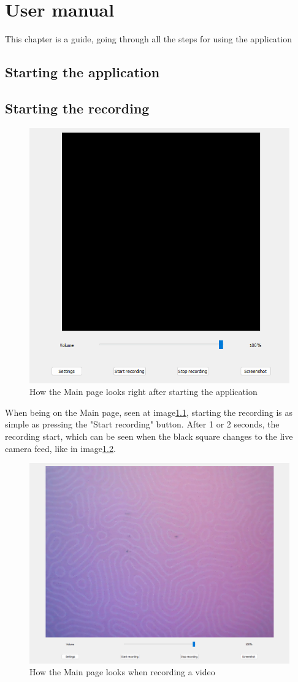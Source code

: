 \chapter{User manual}
\label{chap:manual}

\par This chapter is a guide, going through all the steps for using the application

\section{Starting the application}
\label{sec:manualsec1}

\section{Starting the recording}
\label{sec:manualsec2}

\begin{figure}
    \centering
    \includegraphics[width=0.5\linewidth]{figures/MainPage.png}
    \caption{How the Main page looks right after starting the application}
    \label{fig:MainPageLooks}
\end{figure}

\par When being on the Main page, seen at image\ref{fig:MainPageLooks}, starting the recording is as simple as pressing the "Start recording" button. After 1 or 2 seconds, the recording start, which can be seen when the black square changes to the live camera feed, like in image\ref{fig:MainPageRecordingLooks}.

\begin{figure}
    \centering
    \includegraphics[width=0.5\linewidth]{figures/MainPageRecording.png}
    \caption{How the Main page looks when recording a video}
    \label{fig:MainPageRecordingLooks}
\end{figure}

